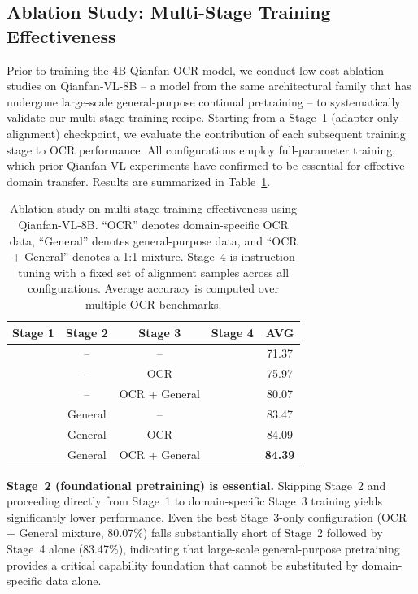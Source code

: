 \documentclass[dvipsnames]{article}
\newcommand{\checkmark}{\ding{51}}
\begin{document}
\subsection{Ablation Study: Multi-Stage Training Effectiveness}

Prior to training the 4B Qianfan-OCR model, we conduct low-cost ablation studies on Qianfan-VL-8B -- a model from the same architectural family that has undergone large-scale general-purpose continual pretraining -- to systematically validate our multi-stage training recipe. Starting from a Stage~1 (adapter-only alignment) checkpoint, we evaluate the contribution of each subsequent training stage to OCR performance. All configurations employ full-parameter training, which prior Qianfan-VL experiments have confirmed to be essential for effective domain transfer. Results are summarized in Table~\ref{tab:ablation}.

\begin{table}[H]
\centering
\small
\setlength{\tabcolsep}{5pt}
\begin{tabular}{cccc|c}
\toprule
\textbf{Stage 1} & \textbf{Stage 2} & \textbf{Stage 3} & \textbf{Stage 4} & \textbf{AVG} \\
\midrule
\checkmark & -- & -- & \checkmark & 71.37 \\
\checkmark & -- & OCR & \checkmark & 75.97 \\
\checkmark & -- & OCR + General & \checkmark & 80.07 \\
\checkmark & General & -- & \checkmark & 83.47 \\
\checkmark & General & OCR & \checkmark & 84.09 \\
\checkmark & General & OCR + General & \checkmark & \textbf{84.39} \\
\bottomrule
\end{tabular}
\caption{Ablation study on multi-stage training effectiveness using Qianfan-VL-8B. ``OCR'' denotes domain-specific OCR data, ``General'' denotes general-purpose data, and ``OCR + General'' denotes a 1:1 mixture. Stage~4 is instruction tuning with a fixed set of alignment samples across all configurations. Average accuracy is computed over multiple OCR benchmarks.}
\label{tab:ablation}
\end{table}

\textbf{Stage~2 (foundational pretraining) is essential.} Skipping Stage~2 and proceeding directly from Stage~1 to domain-specific Stage~3 training yields significantly lower performance. Even the best Stage~3-only configuration (OCR + General mixture, 80.07\%) falls substantially short of Stage~2 followed by Stage~4 alone (83.47\%), indicating that large-scale general-purpose pretraining provides a critical capability foundation that cannot be substituted by domain-specific data alone.
\end{document}
